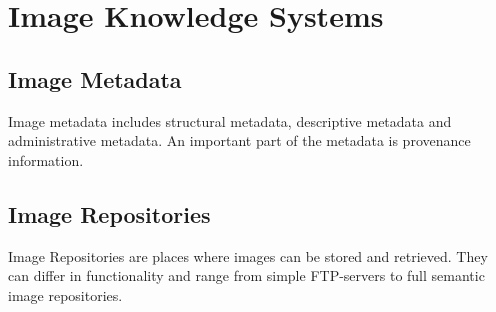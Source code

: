 
\chapter{Image Knowledge Systems} %

\label{Chapter2} %



\section{Image Metadata}

Image metadata includes structural
metadata, descriptive
metadata and administrative
metadata. An important part of the
metadata is provenance information.


\section{Image Repositories}

Image Repositories are places where
images can be stored and retrieved. They can differ in functionality
and range from simple FTP-servers to full
semantic image repositories.
